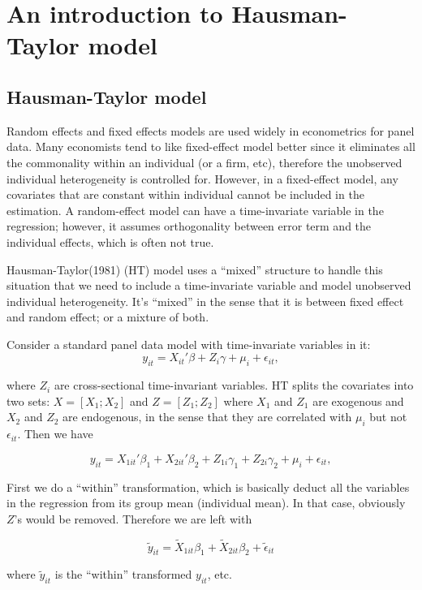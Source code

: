 \chapter{An introduction to Hausman-Taylor model}

\section{Hausman-Taylor model}

Random effects and fixed effects models are used widely in
econometrics for panel data.  Many economists tend to like
fixed-effect model better since it eliminates all the commonality
within an individual (or a firm, etc), therefore the unobserved individual
heterogeneity is controlled for.  However, in a fixed-effect model, any
covariates that are constant within individual cannot be included in
the estimation.  A random-effect model can have a time-invariate
variable in the regression; however, it assumes orthogonality between
error term and the individual effects, which is often not true.

Hausman-Taylor(1981) (HT) model uses a ``mixed'' structure to handle
this situation that we need to include a time-invariate variable and
model unobserved individual heterogeneity.  It's ``mixed'' in the
sense that it is between fixed effect and random effect; or a mixture
of both. 


Consider a standard panel data  model with time-invariate variables in it:
\[ y_{it}= X_{it}' \beta + Z_i \gamma + \mu_i +  \epsilon_{it}, \]

where $Z_i$ are cross-sectional time-invariant variables.  HT splits
the covariates into two sets: $X=[X_1;X_2]$ and $Z=[Z_1; Z_2]$ where
$X_1$ and $Z_1$ are exogenous and $X_2$ and $Z_2$ are endogenous, in
the sense that they are correlated with $\mu_i$ but not
$\epsilon_{it}$.  Then we have

\[ y_{it}= X_{1it}' \beta_1 +  X_{2it}' \beta_2 + Z_{1i} \gamma_1 + Z_{2i} \gamma_2 + \mu_i +  \epsilon_{it}, \]

First we do a ``within'' transformation, which is basically deduct all
the variables in the regression from its group mean (individual mean).
In that case, obviously $Z$'s would be removed.  Therefore we are left
with

\[ \tilde y_{it} = \tilde X_{1it} \beta_1 + \tilde X_{2it} \beta_2 +
\tilde \epsilon_{it}\]

where $\tilde y_{it}$ is the ``within'' transformed $y_{it}$, etc.

